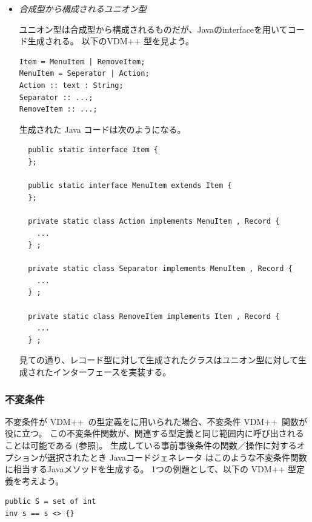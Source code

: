 \documentclass[\pformat,11pt]{jarticle}
\newcommand{\langmancite}{\cite{LangManPP-SCSK}}
\newcommand{\VDM}{VDM++}
\newcommand{\cg}{Javaコードジェネレータ}
\begin{document}
\begin{itemize}
\item {\em 合成型から構成されるユニオン型}

ユニオン型は合成型から構成されるものだが、Javaのinterfaceを用いてコード生成される。
以下のVDM++ 型を見よう。

\begin{screen}
\begin{verbatim}
Item = MenuItem | RemoveItem;
MenuItem = Seperator | Action;
Action :: text : String;
Separator :: ...;
RemoveItem :: ...;
\end{verbatim}
\end{screen}

生成された Java コードは次のようになる。

\begin{screen}
\begin{small}  
\begin{verbatim}
  public static interface Item {
  };

  public static interface MenuItem extends Item {
  };

  private static class Action implements MenuItem , Record {
    ...
  } ;

  private static class Separator implements MenuItem , Record {
    ...
  } ;

  private static class RemoveItem implements Item , Record {
    ...
  } ;
\end{verbatim}
\end{small}  
\end{screen}

見ての通り、レコード型に対して生成されたクラスはユニオン型に対して生成されたインターフェースを実装する。
\end{itemize}

\subsubsection{不変条件}

不変条件が \VDM\ の型定義をに用いられた場合、不変条件 \VDM\ 関数が役に立つ。
この不変条件関数が、関連する型定義と同じ範囲内に呼び出されることは可能である (\langmancite 参照)。 
生成している事前事後条件の関数／操作に対するオプションが選択されたとき
\cg{} はこのような不変条件関数に相当するJavaメソッドを生成する。 
1つの例題として、以下の \VDM{} 型定義を考えよう。

\begin{screen}
\begin{verbatim}
public S = set of int
inv s == s <> {}
\end{verbatim}
\end{screen}
\end{document}
